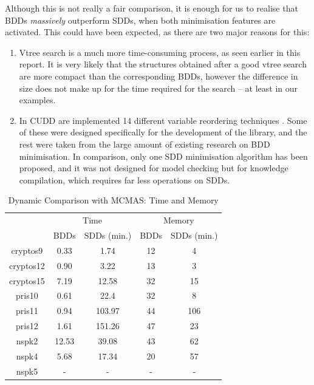 \documentclass[11pt]{report}
\begin{document}
Although this is not really a fair comparison, it is enough for us to realise that BDDs \textit{massively} outperform SDDs, when both minimisation features are activated. This could have been expected, as there are two major reasons for this: \begin{enumerate}
\item Vtree search is a much more time-consuming process, as seen earlier in this report. It is very likely that the structures obtained after a good vtree search are more compact than the corresponding BDDs, however the difference in size does not make up for the time required for the search -- at least in our examples.
\item In CUDD are implemented 14 different variable reordering techniques \cite{CUDD_website}. Some of these were designed specifically for the development of the library, and the rest were taken from the large amount of existing research on BDD minimisation. In comparison, only one SDD minimisation algorithm has been proposed, and it was not designed for model checking but for knowledge compilation, which requires far less operations on SDDs. 
\end{enumerate}



\begin{table}
\centering
\begin{tabular}{|*{5}{c|}}
\hline
 & \multicolumn{2}{c|}{Time} & \multicolumn{2}{c|}{Memory} \\ \cline{2-5}
 & BDDs & SDDs (min.) & BDDs & SDDs (min.) \\ \hline
cryptos9 & 0.33 & 1.74 & 12 & 4 \\ \hline
cryptos12 & 0.90 & 3.22  & 13 & 3 \\ \hline
cryptos15 & 7.19 & 12.58 & 32 & 15 \\ \hline
pris10 & 0.61 & 22.4 & 32 & 8\\ \hline
pris11 & 0.94 & 103.97 & 44 & 106 \\ \hline
pris12 & 1.61 & 151.26 & 47 & 23 \\ \hline
nspk2 & 12.53 & 39.08 & 43 & 62 \\ \hline
nspk4 & 5.68 & 17.34 & 20 & 57 \\ \hline
nspk5 & - & - & -& - \\ \hline
\end{tabular}

\caption{Dynamic Comparison with MCMAS: Time and Memory}
\label{table:dynamiccomparisonwithmcmas}
\end{table}
\end{document}
